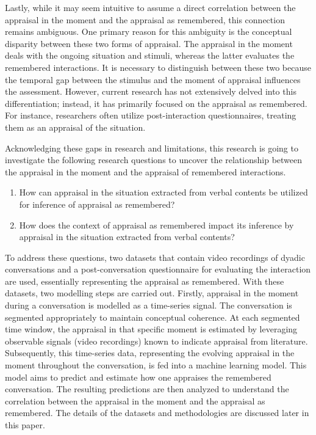 Lastly, while it may seem intuitive to assume a direct correlation between the appraisal in the moment and the appraisal as remembered, this connection remains ambiguous. One primary reason for this ambiguity is the conceptual disparity between these two forms of appraisal. The appraisal in the moment deals with the ongoing situation and stimuli, whereas the latter evaluates the remembered interactions. It is necessary to distinguish between these two because the temporal gap between the stimulus and the moment of appraisal influences the assessment\cite{trope2003temporal}. However, current research has not extensively delved into this differentiation; instead, it has primarily focused on the appraisal as remembered. For instance, researchers often utilize post-interaction questionnaires, treating them as an appraisal of the situation.


Acknowledging these gaps in research and limitations, this research is going to investigate the following research questions to uncover the relationship between the appraisal in the moment and the appraisal of remembered interactions. 

\begin{enumerate}
    \item How can appraisal in the situation extracted from verbal contents be utilized for inference of appraisal as remembered? 
    \item How does the context of appraisal as remembered impact its inference by appraisal in the situation extracted from verbal contents?
\end{enumerate}

To address these questions, two datasets that contain video recordings of dyadic conversations and a post-conversation questionnaire for evaluating the interaction are used, essentially representing the appraisal as remembered. With these datasets, two modelling steps are carried out. Firstly, appraisal in the moment during a conversation is modelled as a time-series signal. The conversation is segmented appropriately to maintain conceptual coherence. At each segmented time window, the appraisal in that specific moment is estimated by leveraging observable signals (video recordings) known to indicate appraisal from literature. Subsequently, this time-series data, representing the evolving appraisal in the moment throughout the conversation, is fed into a machine learning model. This model aims to predict and estimate how one appraises the remembered conversation. The resulting predictions are then analyzed to understand the correlation between the appraisal in the moment and the appraisal as remembered. The details of the datasets and methodologies are discussed later in this paper.

